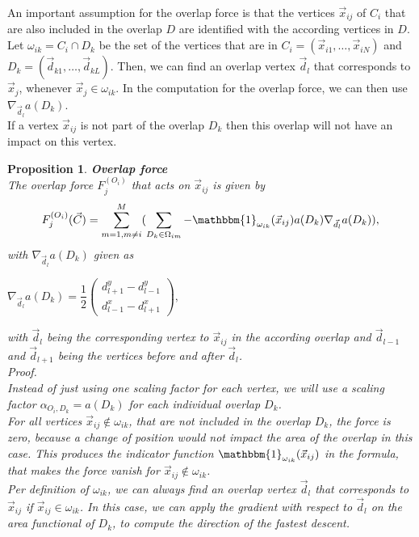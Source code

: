\documentclass[a4paper,12pt,leqno]{article}
\theoremstyle{plain}
\newtheorem{proposition}[theorem]{Proposition}
\theoremstyle{remark}
\begin{document}
An important assumption for the overlap force is that the vertices $\vec{x}_{ij}$ of $C_i$ that are also included in the overlap $D$ are identified with the according vertices in $D$. Let $\omega_{ik} = C_i \cap D_k$ be the set of the vertices that are in $C_i = (\vec{x}_{i1}, \ldots, \vec{x}_{iN})$ and $D_k = (\vec{d}_{k1}, \ldots, \vec{d}_{kL})$. Then, we can find an overlap vertex $\vec{d}_l$ that corresponds to $\vec{x}_j$, whenever $\vec{x}_j \in \omega_{ik}$. In the computation for the overlap force, we can then use $\nabla_{\vec{d}_l} a(D_k)$.\\
If a vertex $\vec{x}_{ij}$ is not part of the overlap $D_k$ then this overlap will not have an impact on this vertex. \\
\begin{proposition} \textbf{Overlap force} \\
	 The overlap force $F_j^{(O_i)}$ that acts on $\vec{x}_{ij}$ is given by
	\begin{align}
		F_j^{(O_i)}(\vec{C}) = \sum\limits_{m=1, m\neq i}^{M} ( \sum\limits_{D_k \in \Omega_{im}} - \mathbbm{1}_{\omega_{ik}}(\vec{x}_{ij})  a(D_k)\nabla_{\vec{d}_{l}} a(D_k)),
	\end{align}
	with $\nabla_{\vec{d}_{l}} a(D_k)$ given as
	\begin{center}
		$\nabla_{\vec{d}_{l}} a(D_k) = 
			\dfrac{1}{2}\begin{pmatrix}	d_{l+1}^{y} - d_{l-1}^{y} \\d_{l-1}^{x} - d_{l+1}^{x}	\end{pmatrix},
		$
	\end{center}
	with $\vec{d}_{l}$ being the corresponding vertex to $\vec{x}_{ij}$ in the according overlap and $\vec{d}_{l-1}$ and $\vec{d}_{l+1}$ being the vertices before and after $\vec{d}_{l}$. \\
	Proof. \\
	Instead of just using one scaling factor for each vertex, we will use a scaling factor $\alpha_{O_i, D_k} = a(D_k)$ for each individual overlap $D_k$. \\
	For all vertices $\vec{x}_{ij} \notin \omega_{ik}$, that are not included in the overlap $D_k$, the force is zero, because a change of position would not impact the area of the overlap in this case. This produces the indicator function $\mathbbm{1}_{\omega_{ik}}(\vec{x}_{ij})$ in the formula, that makes the force vanish for $\vec{x}_{ij} \notin \omega_{ik}$. \\
	Per definition of $\omega_{ik}$, we can always find an overlap vertex $\vec{d}_l$ that corresponds to $\vec{x}_{ij}$ if $\vec{x}_{ij} \in \omega_{ik}$. In this case, we can apply the gradient with respect to $\vec{d}_l$ on the area functional of $D_k$, to compute the direction of the fastest descent. \\	

\end{proposition}
\end{document}
